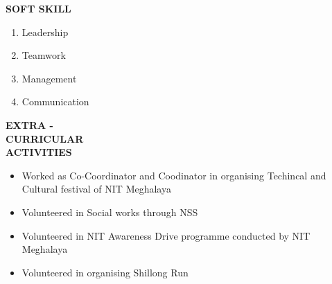\documentclass{article}
\begin{document}
   	\begin{flushleft} 
   		
   		\vspace{0.3in}
   		\textbf{SOFT SKILL}
   		\begin{enumerate}
   			\vspace{-0.30in}
   			\addtolength{\itemindent}{1.559in}
   			\item Leadership 
   			\item Teamwork
   			\item Management 
   			\item Communication
   		\end{enumerate}
   	\end{flushleft}
 
 
 
 \begin{flushleft} 
 	\vspace{0.3in}
 	\textbf{EXTRA - \\CURRICULAR \\ACTIVITIES }
 	\begin{itemize}
 		\vspace{-0.65in}
 		\addtolength{\itemindent}{1.359in}
 		\item  Worked as Co-Coordinator and Coodinator in organising Techincal and \\
 		\hspace{1.3in}
 		Cultural festival of NIT Meghalaya\\ 
 		\item Volunteered in Social works through NSS
 		\item Volunteered in NIT Awareness Drive programme conducted by NIT Meghalaya
 		\item Volunteered in organising Shillong Run
 	\end{itemize}
 \end{flushleft}
 
\end{document}

